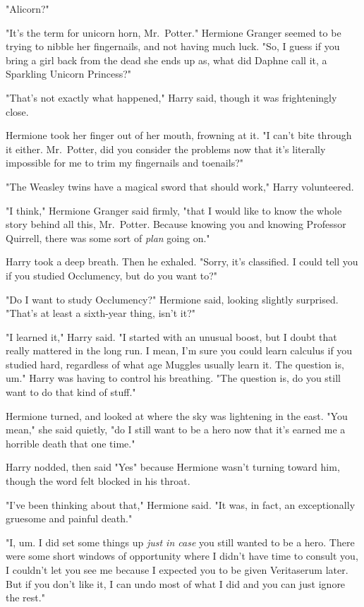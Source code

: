 "Alicorn?"

"It's the term for unicorn horn, Mr.~Potter." Hermione Granger seemed to be
trying to nibble her fingernails, and not having much luck. "So, I guess if you
bring a girl back from the dead she ends up as, what did Daphne call it, a
Sparkling Unicorn Princess?"

"That's not exactly what happened," Harry said, though it was frighteningly
close.

Hermione took her finger out of her mouth, frowning at it. "I can't bite
through it either. Mr.~Potter, did you consider the problems now that it's
literally impossible for me to trim my fingernails and toenails?"

"The Weasley twins have a magical sword that should work," Harry volunteered.

"I think," Hermione Granger said firmly, "that I would like to know the whole
story behind all this, Mr.~Potter. Because knowing you and knowing Professor
Quirrell, there was some sort of \emph{plan} going on."

Harry took a deep breath. Then he exhaled. "Sorry, it's{\el} classified. I
could tell you if you studied Occlumency, but{\el} do you want to?"

"Do I want to study Occlumency?" Hermione said, looking slightly surprised.
"That's at least a sixth-year thing, isn't it?"

"I learned it," Harry said. "I started with an unusual boost, but I doubt that
really mattered in the long run. I mean, I'm sure you could learn calculus if
you studied hard, regardless of what age Muggles usually learn it. The question
is, um." Harry was having to control his breathing. "The question is, do you
still want to do{\el} that kind of stuff."

Hermione turned, and looked at where the sky was lightening in the east. "You
mean," she said quietly, "do I still want to be a hero now that it's earned me
a horrible death that one time."

Harry nodded, then said "Yes" because Hermione wasn't turning toward him,
though the word felt blocked in his throat.

"I've been thinking about that," Hermione said. "It was, in fact, an
exceptionally gruesome and painful death."

"I, um. I did set some things up \emph{just in case} you still wanted to be a
hero. There were some short windows of opportunity where I didn't have time to
consult you, I couldn't let you see me because I expected you to be given
Veritaserum later. But if you don't like it, I can undo most of what I did and
you can just ignore the rest."

